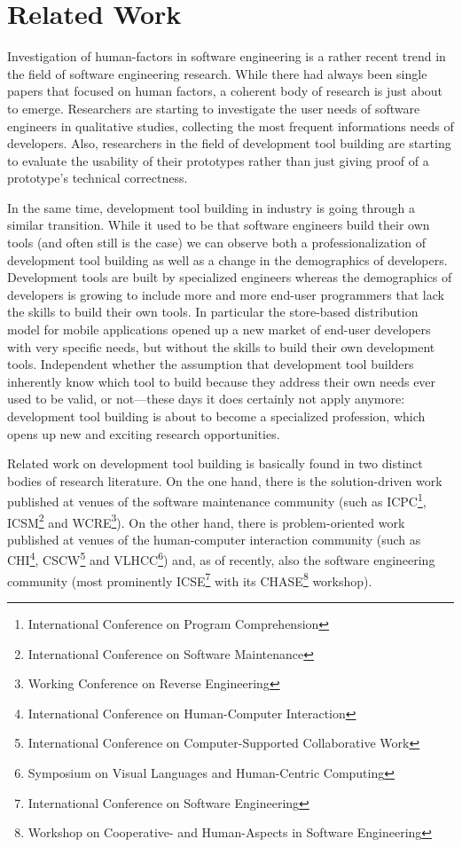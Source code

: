 \chapter{Related Work}
\label{the chapter on related work}

Investigation of human-factors in software engineering is a rather recent trend in the field of software engineering research. While there had always been single papers that focused on human factors, a coherent body of research is just about to emerge. 
Researchers are starting to investigate the user needs of software engineers in qualitative studies, collecting \eg the most frequent informations needs of developers. Also, researchers in the field of development tool building are starting to evaluate the usability of their prototypes rather than just giving proof of a prototype's technical correctness. 

In the same time, development tool building in industry is going through a similar transition. While it used to be that software engineers build their own tools (and often still is the case) we can observe both a professionalization of development tool building as well as a change in the demographics of developers. Development tools are built by specialized engineers whereas the demographics of developers is growing to include more and more end-user programmers that lack the skills to build their own tools. In particular the store-based distribution model for mobile applications opened up a new market of end-user developers with very specific needs, but without the skills to build their own development tools. Independent whether the assumption that development tool builders inherently know which tool to build because they address their own needs ever used to be valid, or not---these days it does certainly not apply anymore: development tool building is about to become a specialized profession, which opens up new and exciting research opportunities.

Related work on development tool building is basically found in two distinct bodies of research literature. On the one hand, there is the solution-driven work published at venues of the software maintenance community (such as ICPC\footnote{International Conference on Program Comprehension}, ICSM\footnote{International Conference on Software Maintenance} and WCRE\footnote{Working Conference on Reverse Engineering}). On the other hand, there is problem-oriented work published at venues of the human-computer interaction community (such as CHI\footnote{International Conference on Human-Computer Interaction}, CSCW\footnote{International Conference on Computer-Supported Collaborative Work} and VLHCC\footnote{Symposium on Visual Languages and Human-Centric Computing}) and, as of recently, also the software engineering community (most prominently ICSE\footnote{International Conference on Software Engineering} with its CHASE\footnote{Workshop on Cooperative- and Human-Aspects in Software Engineering} workshop). 

